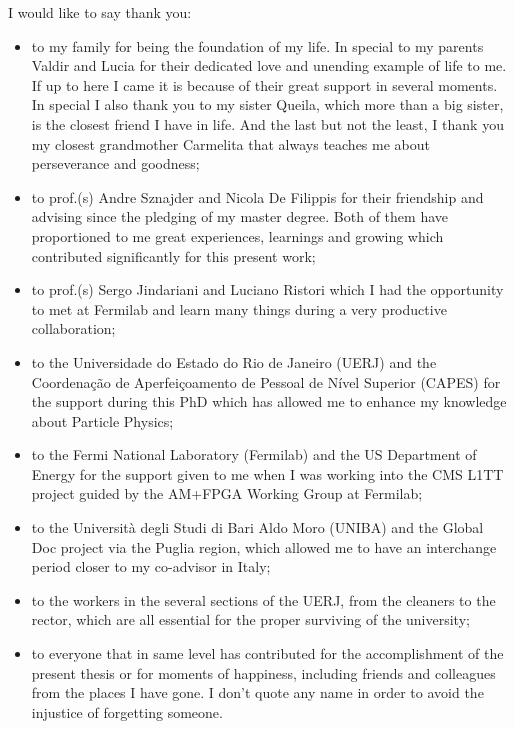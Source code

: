 \documentclass[a4paper,12pt,oneside,onecolumn,final,fleqn]{repUERJ}
\begin{document}
I would like to say thank you:
\begin{itemize}
\item to my family for being the foundation of my life. In special to my parents Valdir and Lucia for their dedicated love and unending example of life to me. If up to here I came it is because of their great support in several moments. In special I also thank you to my sister Queila, which more than a big sister, is the closest friend I have in life. And the last but not the least, I thank you my closest grandmother Carmelita that always teaches me about perseverance and goodness;
\item to prof.(s) Andre Sznajder and Nicola De Filippis for their friendship and advising since the pledging of my master degree. Both of them have proportioned to me great experiences, learnings and growing which contributed significantly for this present work;
\item to prof.(s) Sergo Jindariani and Luciano Ristori which I had the opportunity to met at Fermilab and learn many things during a very productive collaboration;
\item to the Universidade do Estado do Rio de Janeiro (UERJ) and the Coordenação de Aperfeiçoamento de Pessoal de Nível Superior (CAPES) for the support during this PhD which has allowed me to enhance my knowledge about Particle Physics;
\item to the Fermi National Laboratory (Fermilab) and the US Department of Energy for the support given to me when I was working into the CMS L1TT project guided by the AM+FPGA Working Group at Fermilab;
\item to the Università degli Studi di Bari Aldo Moro (UNIBA) and the Global Doc project via the Puglia region, which allowed me to have an interchange period closer to my co-advisor in Italy;
\item to the workers in the several sections of the UERJ, from the cleaners to the rector, which are all essential for the proper surviving of the university;
\item to everyone that in same level has contributed for the accomplishment of the present thesis or for moments of happiness, including friends and colleagues from the places I have gone. I don't quote any name in order to avoid the injustice of forgetting someone.
\end{itemize}
\end{document}
